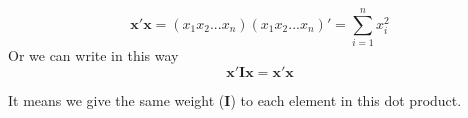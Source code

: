\documentclass[12pt]{article}
\begin{document}
\begin{equation*}
\bm{x}'\bm{x} = (x_1 x_2 ... x_{n})(x_1 x_2 ... x_{n})' = \sum\limits_{i = 1} ^n x_{i}^{2}
\end{equation*}
Or we can write in this way
\begin{equation*}
\bm{x}'\bm{I}\bm{x} = \bm{x}'\bm{x}
\end{equation*}

It means we give the same weight ($ \bm{I} $) to each element in this dot product. 









\end{document}

